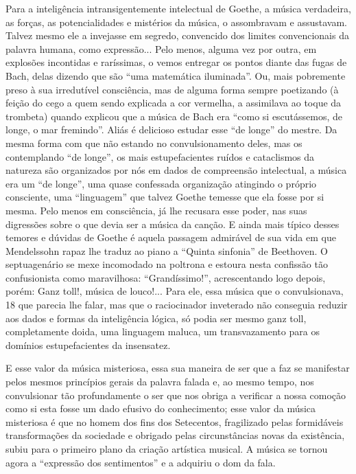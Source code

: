 Para a inteligência intransigentemente intelectual de Goethe, a música
verdadeira, as forças, as potencialidades e mistérios da música, o
assombravam e assustavam. Talvez mesmo ele a invejasse em segredo,
convencido dos limites convencionais da palavra humana, como
expressão... Pelo menos, alguma vez por outra, em explosões incontidas e
raríssimas, o vemos entregar os pontos diante das fugas de Bach, delas
dizendo que são ``uma matemática iluminada''. Ou, mais pobremente preso
à sua irredutível consciência, mas de alguma forma sempre poetizando (à
feição do cego a quem sendo explicada a cor vermelha, a assimilava ao
toque da trombeta) quando explicou que a música de Bach era ``como si
escutássemos, de longe, o mar fremindo''. Aliás é delicioso estudar esse
``de longe'' do mestre. Da mesma forma com que não estando no
convulsionamento deles, mas os contemplando ``de longe'', os mais
estupefacientes ruídos e cataclismos da natureza são organizados por nós
em dados de compreensão intelectual, a música era um ``de longe'', uma
quase confessada organização atingindo o próprio consciente, uma
``linguagem'' que talvez Goethe temesse que ela fosse por si mesma. Pelo
menos em consciência, já lhe recusara esse poder, nas suas digressões
sobre o que devia ser a música da canção. E ainda mais típico desses
temores e dúvidas de Goethe é aquela passagem admirável de sua vida em
que Mendelssohn rapaz lhe traduz ao piano a ``Quinta sinfonia'' de
Beethoven. O septuagenário se mexe incomodado na poltrona e estoura
nesta confissão tão confusionista como maravilhosa: ``Grandíssimo!'',
acrescentando logo depois, porém: Ganz toll!, música de louco!... Para
ele, essa música que o convulsionava, 18 que parecia lhe falar, mas que
o raciocinador inveterado não conseguia reduzir aos dados e formas da
inteligência lógica, só podia ser mesmo ganz toll, completamente doida,
uma linguagem maluca, um transvazamento para os domínios estupefacientes
da insensatez.

E esse valor da música misteriosa, essa sua maneira de ser que a faz se
manifestar pelos mesmos princípios gerais da palavra falada e, ao mesmo
tempo, nos convulsionar tão profundamente o ser que nos obriga a
verificar a nossa comoção como si esta fosse um dado efusivo do
conhecimento; esse valor da música misteriosa é que no homem dos fins
dos Setecentos, fragilizado pelas formidáveis transformações da
sociedade e obrigado pelas circunstâncias novas da existência, subiu
para o primeiro plano da criação artística musical. A música se tornou
agora a ``expressão dos sentimentos'' e a adquiriu o dom da fala.

